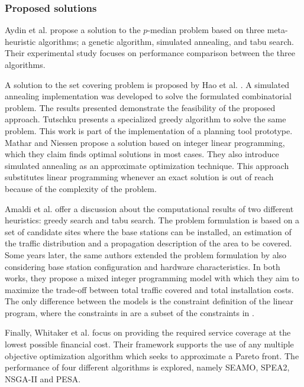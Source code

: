 \subsubsection{Proposed solutions}

Aydin et al. \cite{Aydin:Heuristic.Optimization.Of.WCDMA} propose
a solution to the $p$-median problem based on three meta-heuristic
algorithms; a genetic algorithm, simulated annealing, and tabu search.
Their experimental study focuses on performance comparison between
the three algorithms.

A solution to the set covering problem is proposed by Hao et al. \cite{minimum.set.covering.problem:1997}.
A simulated annealing implementation was developed to solve the formulated
combinatorial problem. The results presented demonstrate the feasibility
of the proposed approach. Tutschku \cite{minimum.set.covering.problem:1998}
presents a specialized greedy algorithm to solve the same problem.
This work is part of the implementation of a planning tool prototype.
Mathar and Niessen \cite{minimum.set.covering.problem:2000} propose
a solution based on integer linear programming, which they claim finds
optimal solutions in most cases. They also introduce simulated annealing
as an approximate optimization technique. This approach substitutes
linear programming whenever an exact solution is out of reach because
of the complexity of the problem.

Amaldi et al. \cite{amaldi:planning.umts.base.station.location} offer
a discussion about the computational results of two different heuristics:
greedy search and tabu search. The problem formulation is based on
a set of candidate sites where the base stations can be installed,
an estimation of the traffic distribution and a propagation description
of the area to be covered. Some years later, the same authors \cite{Amaldi:Radio.planning.and.coveraga.optimization}
extended the problem formulation by also considering base station
configuration and hardware characteristics. In both works, they propose
a mixed integer programming model with which they aim to maximize
the trade-off between total traffic covered and total installation
costs. The only difference between the models is the constraint definition
of the linear program, where the constraints in \cite{amaldi:planning.umts.base.station.location}
are a subset of the constraints in \cite{Amaldi:Radio.planning.and.coveraga.optimization}.

Finally, Whitaker et al. \cite{GA.for.antenna.placement:2005} focus
on providing the required service coverage at the lowest possible
financial cost. Their framework supports the use of any multiple objective
optimization algorithm which seeks to approximate a Pareto front.
The performance of four different algorithms is explored, namely SEAMO,
SPEA2, NSGA-II and PESA.


